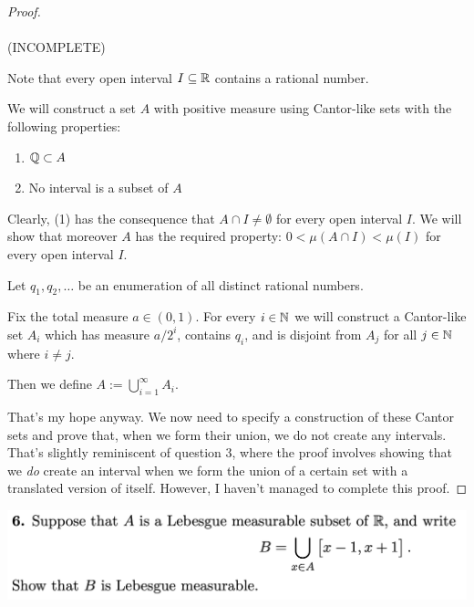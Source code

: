 \begin{proof}~\\~\\
  (INCOMPLETE)

  Note that every open interval $I \subseteq \mathbb{R}$ contains a rational number.

  We will construct a set $A$ with positive measure using Cantor-like sets with the following properties:
  \begin{enumerate}
  \item $\mathbb{Q} \subset A$
  \item No interval is a subset of $A$
  \end{enumerate}
  Clearly, (1) has the consequence that $A \cap I \neq \emptyset$ for every open interval $I$. We will show
  that moreover $A$ has the required property: $0 < \mu(A \cap I) < \mu(I)$ for every open interval $I$.

  Let $q_1, q_2, \ldots$ be an enumeration of all distinct rational numbers.

  Fix the total measure $a \in (0, 1)$. For every $i \in \mathbb{N}$ we will construct a Cantor-like set $A_i$ which
  has measure $a/2^i$, contains $q_i$, and is disjoint from $A_j$ for all $j \in \mathbb{N}$ where $i \neq j$.

  Then we define $A := \bigcup_{i=1}^\infty A_i$.

  That's my hope anyway. We now need to specify a construction of these Cantor sets and prove that, when we
  form their union, we do not create any intervals. That's slightly reminiscent of question 3, where the proof
  involves showing that we {\it do} create an interval when we form the union of a certain set with a translated
  version of itself. However, I haven't managed to complete this proof.
\end{proof}


\newpage
\begin{mdframed}
\includegraphics[width=400pt]{img/analysis--berkeley-202a-hw05-3d2c.png}
\end{mdframed}

